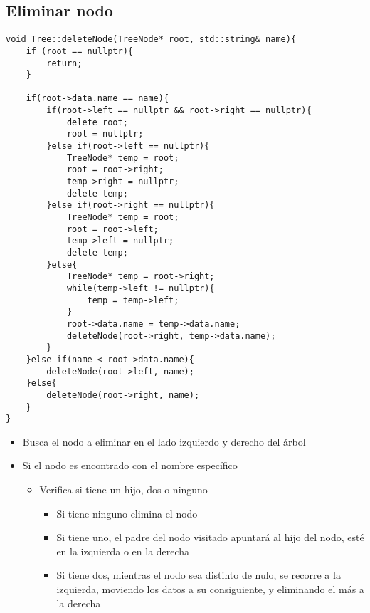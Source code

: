 \documentclass[11pt]{article}
\begin{document}
\subsection{Eliminar nodo}
\label{sec:org24022a7}
\begin{verbatim}
void Tree::deleteNode(TreeNode* root, std::string& name){
    if (root == nullptr){
        return;
    }

    if(root->data.name == name){
        if(root->left == nullptr && root->right == nullptr){
            delete root;
            root = nullptr;
        }else if(root->left == nullptr){
            TreeNode* temp = root;
            root = root->right;
            temp->right = nullptr;
            delete temp;
        }else if(root->right == nullptr){
            TreeNode* temp = root;
            root = root->left;
            temp->left = nullptr;
            delete temp;
        }else{
            TreeNode* temp = root->right;
            while(temp->left != nullptr){
                temp = temp->left;
            }
            root->data.name = temp->data.name;
            deleteNode(root->right, temp->data.name);
        }
    }else if(name < root->data.name){
        deleteNode(root->left, name);
    }else{
        deleteNode(root->right, name);
    }
}
\end{verbatim}
\begin{itemize}
\item Busca el nodo a eliminar en el lado izquierdo y
derecho del árbol
\item Si el nodo es encontrado con el nombre específico
\begin{itemize}
\item Verifica si tiene un hijo, dos o ninguno
\begin{itemize}
\item Si tiene ninguno elimina el nodo
\item Si tiene uno, el padre del nodo visitado
apuntará al hijo del nodo, esté en la
izquierda o en la derecha
\item Si tiene dos, mientras el nodo sea distinto
de nulo, se recorre a la izquierda, moviendo
los datos a su consiguiente, y eliminando el
más a la derecha
\end{itemize}
\end{itemize}
\end{itemize}
\end{document}
